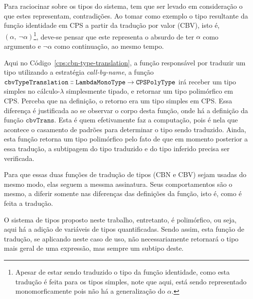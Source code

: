 Para raciocinar sobre os tipos do sistema, tem que ser levado em consideração o que estes representam, contradições.
Ao tomar como exemplo o tipo resultante da função identidade em CPS a partir da tradução por valor (CBV), isto é, $(\alpha,\ \neg\alpha)$\footnote{Apesar de estar sendo traduzido o tipo da função identidade, como esta tradução é feita para os tipos simples, note que aqui, está sendo representado monomorficamente pois não há a generalização do $\alpha$.}, deve-se pensar que este representa o absurdo de ter $\alpha$ como argumento e $\neg\alpha$ como continuação, ao mesmo tempo.


Aqui no Código~\ref{cps:cbn-type-translation}, a função responsável por traduzir um tipo utilizando a estratégia \textit{call-by-name}, a função $\mathtt{cbvTypeTranslation \dblcolon LambdaMonoType \to CPSPolyType}$ irá receber um tipo simples no cálculo-$\lambda$ simplesmente tipado, e retornar um tipo polimórfico em CPS.
Perceba que na definição, o retorno era um tipo simples em CPS. 
Essa diferença é justificada ao se observar o corpo desta função, onde há a definição da função $\mathtt{cbvTrans}$.
Esta é quem efetivamente faz a computação, pois é nela que acontece o casamento de padrões para determinar o tipo sendo traduzido.
Ainda, esta função retorna um tipo polimórfico pelo fato de que em momento posterior a essa tradução, a subtipagem do tipo traduzido e do tipo inferido precisa ser verificada.


Para que essas duas funções de tradução de tipos (CBN e CBV) sejam usadas do mesmo modo, elas seguem a messma assinatura. 
Seus comportamentos são o mesmo, a diferir somente nas diferenças das definições da função, isto é, como é feita a tradução.

O sistema de tipos proposto neste trabalho, entretanto, é polimórfico, ou seja, aqui há a adição de variáveis de tipos quantificadas.
Sendo assim, esta função de tradução, se aplicando neste caso de uso, não necessariamente retornará o tipo mais geral de uma expressão, mas sempre um subtipo deste.
